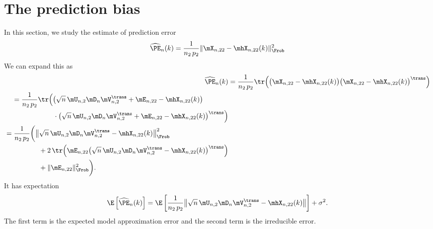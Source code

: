 \section{The prediction bias}

In this section, we study the estimate of prediction error
\[
	\widehat{\PE}_n(k)
		=
			\frac{1}{n_2 \, p_2}
			\| \mX_{n,22} - \mhX_{n,22}(k) \|_\Frob^2
\]
We can expand this as
\begin{align*}
	\widehat{\PE}_n(k)
		&=
			\frac{1}{n_2 \, p_2}
			\tr \Big(
				\big(
					\mX_{n,22} - \mhX_{n,22}(k)
				\big)
				\big(
					\mX_{n,22} - \mhX_{n,22}(k)
				\big)^\trans
			\Big) \\
	\begin{split}
		&=
			\frac{1}{n_2 \, p_2}
			\tr \Big(
				\big(
					\sqrt{n} \, \mU_{n,2} \mD_n \mV_{n,2}^\trans 
					+
					\mE_{n,22}
					- 
					\mhX_{n,22}(k)
				\big) \\
				&\qquad\qquad\qquad\cdot
				\big(
					\sqrt{n} \, \mU_{n,2} \mD_n \mV_{n,2}^\trans 
					+
					\mE_{n,22}
					- 
					\mhX_{n,22}(k)
				\big)^\trans
			\Big)
	\end{split} \\
	\begin{split}
		&=
			\frac{1}{n_2 \, p_2}
			\bigg(
				\big\| 
					\sqrt{n} \, \mU_{n,2} \mD_n \mV_{n,2}^\trans
					-
					\mhX_{n,22}(k)
				\big\|_\Frob^2 \\
				&\qquad\qquad\quad+
				2 \, 
				\tr \Big(
					\mE_{n,22}
					\big(
						\sqrt{n} \, \mU_{n,2} \mD_n \mV_{n,2}^\trans 
						- 
						\mhX_{n,22}(k)
					\big)^\trans
				\Big) \\
				&\qquad\qquad\quad+
				\|
					\mE_{n,22}
				\|_\Frob^2
			\bigg).
	\end{split}
\end{align*}
It has expectation
\[
	\E \left[ \widehat{\PE}_n(k) \right]
		=
			\E \left[
				\frac{1}{n_2 \, p_2}
				\big\| 
					\sqrt{n} \, \mU_{n,2} \mD_n \mV_{n,2}^\trans
					-
					\mhX_{n,22}(k)
				\big\|
			\right]
			+
			\sigma^2.
\]
The first term is the expected model approximation error and the second term is the irreducible error.


